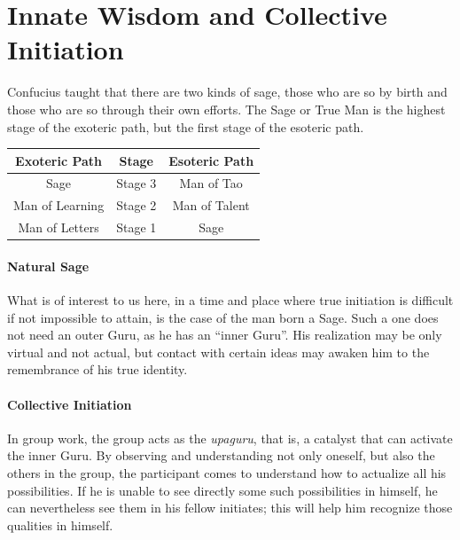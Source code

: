 \section{Innate Wisdom and Collective Initiation}

Confucius taught that there are two kinds of sage, those who are so by birth and those who are so through their own efforts. The Sage or True Man is the highest stage of the exoteric path, but the first stage of the esoteric path.

\begin{table}[h]\centering\small
\begin{tabular}{ccc}\toprule
\textbf{Exoteric Path} & \textbf{Stage} & \textbf{Esoteric Path} \\\midrule
Sage & Stage 3 & Man of Tao \\

Man of Learning & Stage 2 & Man of Talent \\

Man of Letters & Stage 1 & Sage \\\bottomrule
\end{tabular}
\end{table}

\paragraph{Natural Sage}


What is of interest to us here, in a time and place where true initiation is difficult if not impossible to attain, is the case of the man born a Sage. Such a one does not need an outer Guru, as he has an ``inner Guru''. His realization may be only virtual and not actual, but contact with certain ideas may awaken him to the remembrance of his true identity.

\paragraph{Collective Initiation}


In group work, the group acts as the \emph{upaguru}, that is, a catalyst that can activate the inner Guru. By observing and understanding not only oneself, but also the others in the group, the participant comes to understand how to actualize all his possibilities. If he is unable to see directly some such possibilities in himself, he can nevertheless see them in his fellow initiates; this will help him recognize those qualities in himself.


